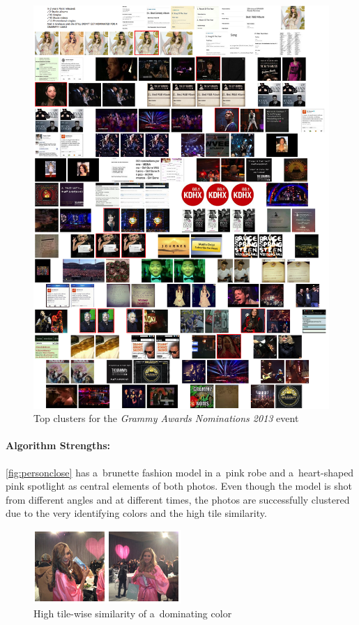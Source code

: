 \begin{figure}[!ht]
  \centering
  \includegraphics[width=0.97\linewidth]{./grammy_clusters.png}
  \caption{Top clusters for the \emph{Grammy Awards Nominations 2013} event}
  \label{fig:topgrammy}
\end{figure}

\paragraph{Algorithm Strengths:} 

\autoref{fig:personclose} has a~brunette fashion model in a~pink robe
and a~heart-shaped pink spotlight as central elements of both photos. 
Even though the model is shot from different angles and at different times,
the photos are successfully clustered due to the very identifying colors
and the high tile similarity. 

\begin{figure}[!ht]
  \centering
  \includegraphics[width=0.4\linewidth]{./person.png}
  \caption{High tile-wise similarity of a~dominating color}
  \label{fig:personclose}
\end{figure}

